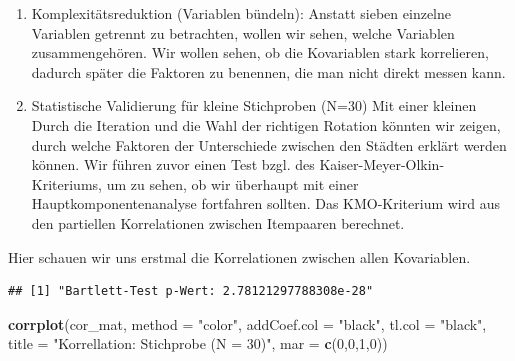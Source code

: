 \documentclass[
]{article}
\newenvironment{Shaded}{\begin{snugshade}}{\end{snugshade}}
\newcommand{\AttributeTok}[1]{\textcolor[rgb]{0.13,0.29,0.53}{#1}}
\newcommand{\CommentTok}[1]{\textcolor[rgb]{0.56,0.35,0.01}{\textit{#1}}}
\newcommand{\DecValTok}[1]{\textcolor[rgb]{0.00,0.00,0.81}{#1}}
\newcommand{\FunctionTok}[1]{\textcolor[rgb]{0.13,0.29,0.53}{\textbf{#1}}}
\newcommand{\NormalTok}[1]{#1}
\newcommand{\OtherTok}[1]{\textcolor[rgb]{0.56,0.35,0.01}{#1}}
\newcommand{\SpecialCharTok}[1]{\textcolor[rgb]{0.81,0.36,0.00}{\textbf{#1}}}
\newcommand{\StringTok}[1]{\textcolor[rgb]{0.31,0.60,0.02}{#1}}
\begin{document}
\begin{enumerate}
\def\labelenumi{\arabic{enumi}.}
\item
  Komplexitätsreduktion (Variablen bündeln): Anstatt sieben einzelne
  Variablen getrennt zu betrachten, wollen wir sehen, welche Variablen
  zusammengehören. Wir wollen sehen, ob die Kovariablen stark
  korrelieren, dadurch später die Faktoren zu benennen, die man nicht
  direkt messen kann.
\item
  Statistische Validierung für kleine Stichproben (N=30) Mit einer
  kleinen Durch die Iteration und die Wahl der richtigen Rotation
  könnten wir zeigen, durch welche Faktoren der Unterschiede zwischen
  den Städten erklärt werden können. Wir führen zuvor einen Test bzgl.
  des Kaiser-Meyer-Olkin-Kriteriums, um zu sehen, ob wir überhaupt mit
  einer Hauptkomponentenanalyse fortfahren sollten. Das KMO-Kriterium
  wird aus den partiellen Korrelationen zwischen Itempaaren berechnet.
\end{enumerate}

Hier schauen wir uns erstmal die Korrelationen zwischen allen
Kovariablen.

\begin{Shaded}
\end{Shaded}

\begin{verbatim}
## [1] "Bartlett-Test p-Wert: 2.78121297788308e-28"
\end{verbatim}

\begin{Shaded}
\begin{Highlighting}[]
\FunctionTok{corrplot}\NormalTok{(cor\_mat, }\AttributeTok{method =} \StringTok{"color"}\NormalTok{, }\AttributeTok{addCoef.col =} \StringTok{"black"}\NormalTok{, }\AttributeTok{tl.col =} \StringTok{"black"}\NormalTok{, }\AttributeTok{title =} \StringTok{"Korrellation: Stichprobe (N = 30)"}\NormalTok{, }\AttributeTok{mar =} \FunctionTok{c}\NormalTok{(}\DecValTok{0}\NormalTok{,}\DecValTok{0}\NormalTok{,}\DecValTok{1}\NormalTok{,}\DecValTok{0}\NormalTok{))}
\end{Highlighting}
\end{Shaded}
\end{document}
